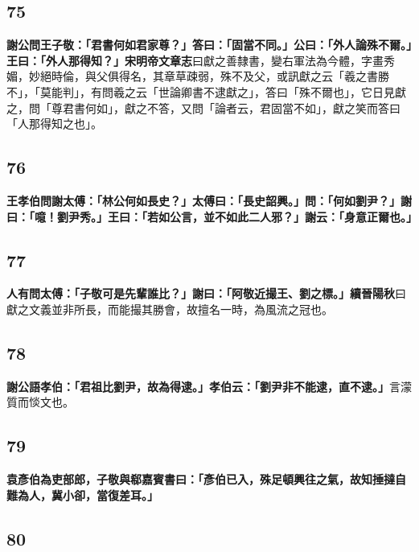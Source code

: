 \subsection*{75}

\textbf{謝公問王子敬：「君書何如君家尊？」答曰：「固當不同。」公曰：「外人論殊不爾。」王曰：「外人那得知？」}{\footnotesize \textbf{宋明帝文章志}曰獻之善隸書，變右軍法為今體，字畫秀媚，妙絕時倫，與父俱得名，其章草疎弱，殊不及父，或訊獻之云「羲之書勝不」，「莫能判」，有問羲之云「世論卿書不逮獻之」，答曰「殊不爾也」，它日見獻之，問「尊君書何如」，獻之不答，又問「論者云，君固當不如」，獻之笑而答曰「人那得知之也」。}

\subsection*{76}

\textbf{王孝伯問謝太傅：「林公何如長史？」太傅曰：「長史韶興。」問：「何如劉尹？」謝曰：「噫！劉尹秀。」王曰：「若如公言，並不如此二人邪？」謝云：「身意正爾也。」}

\subsection*{77}

\textbf{人有問太傅：「子敬可是先輩誰比？」謝曰：「阿敬近撮王、劉之標。」}{\footnotesize \textbf{續晉陽秋}曰獻之文義並非所長，而能撮其勝會，故擅名一時，為風流之冠也。}

\subsection*{78}

\textbf{謝公語孝伯：「君祖比劉尹，故為得逮。」孝伯云：「劉尹非不能逮，直不逮。」}{\footnotesize 言濛質而惔文也。}

\subsection*{79}

\textbf{袁彥伯為吏部郎，子敬與郗嘉賓書曰：「彥伯已入，殊足頓興往之氣，故知捶撻自難為人，冀小卻，當復差耳。」}

\subsection*{80}

